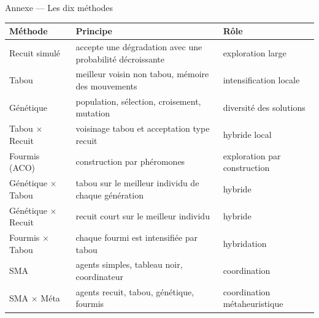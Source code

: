 \begin{frame}{Annexe --- Les dix méthodes}
  \scriptsize
  \renewcommand{\arraystretch}{1.10}
  \begin{tabular}{@{}>{\raggedright\arraybackslash}p{3.0cm}>{\raggedright\arraybackslash}p{5.4cm}>{\raggedright\arraybackslash}p{4.2cm}@{}}
    \toprule
    \textbf{Méthode} & \textbf{Principe} & \textbf{Rôle} \\
    \midrule
    Recuit simulé & accepte une dégradation avec une probabilité décroissante
      & exploration large \\
    Tabou & meilleur voisin non tabou, mémoire des mouvements
      & intensification locale \\
    Génétique & population, sélection, croisement, mutation
      & diversité des solutions \\
    Tabou $\times$ Recuit & voisinage tabou et acceptation type recuit
      & hybride local \\
    Fourmis (ACO) & construction par phéromones
      & exploration par construction \\
    Génétique $\times$ Tabou & tabou sur le meilleur individu de chaque
      génération & hybride \\
    Génétique $\times$ Recuit & recuit court sur le meilleur individu
      & hybride \\
    Fourmis $\times$ Tabou & chaque fourmi est intensifiée par tabou
      & hybridation \\
    SMA & agents simples, tableau noir, coordinateur
      & coordination \\
    SMA $\times$ Méta & agents recuit, tabou, génétique, fourmis
      & coordination métaheuristique \\
    \bottomrule
  \end{tabular}
\end{frame}

